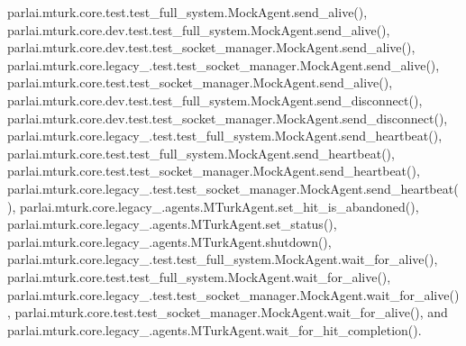 parlai.\+mturk.\+core.\+test.\+test\+\_\+full\+\_\+system.\+Mock\+Agent.\+send\+\_\+alive(), parlai.\+mturk.\+core.\+dev.\+test.\+test\+\_\+full\+\_\+system.\+Mock\+Agent.\+send\+\_\+alive(), parlai.\+mturk.\+core.\+dev.\+test.\+test\+\_\+socket\+\_\+manager.\+Mock\+Agent.\+send\+\_\+alive(), parlai.\+mturk.\+core.\+legacy\+\_.\+test.\+test\+\_\+socket\+\_\+manager.\+Mock\+Agent.\+send\+\_\+alive(), parlai.\+mturk.\+core.\+test.\+test\+\_\+socket\+\_\+manager.\+Mock\+Agent.\+send\+\_\+alive(), parlai.\+mturk.\+core.\+dev.\+test.\+test\+\_\+full\+\_\+system.\+Mock\+Agent.\+send\+\_\+disconnect(), parlai.\+mturk.\+core.\+dev.\+test.\+test\+\_\+socket\+\_\+manager.\+Mock\+Agent.\+send\+\_\+disconnect(), parlai.\+mturk.\+core.\+legacy\+\_.\+test.\+test\+\_\+full\+\_\+system.\+Mock\+Agent.\+send\+\_\+heartbeat(), parlai.\+mturk.\+core.\+test.\+test\+\_\+full\+\_\+system.\+Mock\+Agent.\+send\+\_\+heartbeat(), parlai.\+mturk.\+core.\+test.\+test\+\_\+socket\+\_\+manager.\+Mock\+Agent.\+send\+\_\+heartbeat(), parlai.\+mturk.\+core.\+legacy\+\_.\+test.\+test\+\_\+socket\+\_\+manager.\+Mock\+Agent.\+send\+\_\+heartbeat(), parlai.\+mturk.\+core.\+legacy\+\_.\+agents.\+M\+Turk\+Agent.\+set\+\_\+hit\+\_\+is\+\_\+abandoned(), parlai.\+mturk.\+core.\+legacy\+\_.\+agents.\+M\+Turk\+Agent.\+set\+\_\+status(), parlai.\+mturk.\+core.\+legacy\+\_.\+agents.\+M\+Turk\+Agent.\+shutdown(), parlai.\+mturk.\+core.\+legacy\+\_.\+test.\+test\+\_\+full\+\_\+system.\+Mock\+Agent.\+wait\+\_\+for\+\_\+alive(), parlai.\+mturk.\+core.\+test.\+test\+\_\+full\+\_\+system.\+Mock\+Agent.\+wait\+\_\+for\+\_\+alive(), parlai.\+mturk.\+core.\+legacy\+\_.\+test.\+test\+\_\+socket\+\_\+manager.\+Mock\+Agent.\+wait\+\_\+for\+\_\+alive(), parlai.\+mturk.\+core.\+test.\+test\+\_\+socket\+\_\+manager.\+Mock\+Agent.\+wait\+\_\+for\+\_\+alive(), and parlai.\+mturk.\+core.\+legacy\+\_.\+agents.\+M\+Turk\+Agent.\+wait\+\_\+for\+\_\+hit\+\_\+completion().

\mbox{\label{classparlai_1_1mturk_1_1core_1_1dev_1_1test_1_1test__full__system_1_1MockAgent_a3f78abd8b89afc52fae4a46424c18753}} 
